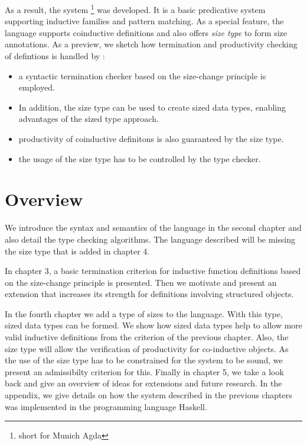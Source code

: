 As a result, the system \mugda\footnote{short for Munich Agda} was developed.
It is a basic predicative system supporting inductive families and pattern matching. 
As a special feature, the language supports coinductive definitions and also offers \emph{size type} to form size annotations. 
As a preview, we sketch how termination and productivity checking of defintions is handled by \mugda:
\begin{itemize}
\item
a syntactic termination checker based on the size-change principle is employed.
\item
In addition, the size type can be used to create sized data types, enabling advantages of the 
sized type approach.
\item
productivity of coinductive definitons is also guaranteed by the size type.
\item
the usage of the size type has to be controlled by the type checker.
\end{itemize}  
\section{Overview}
We introduce the syntax and semantics of the \mugda language in the second chapter and also detail the type checking algorithms. The language described will be missing the size type that is added in chapter 4. 

In chapter 3, a basic termination criterion for inductive function definitions based on the size-change principle is presented. Then we motivate and present an extension that increases its strength for definitions involving structured objects.

In the fourth chapter we add a type of sizes to the language.
With this type, sized data types can be formed. We show how sized data types help to allow more valid inductive definitions from the criterion of the previous chapter.
Also, the size type will allow the verification of productivity for co-inductive objects.
As the use of the size type has to be constrained for the system to be sound, we present an admissibilty criterion for this.
Finally in chapter 5, we take a look back and give an overview of ideas for extensions and future research.
In the appendix, we give details on how the system described in the previous chapters was implemented in the programming language Haskell.






